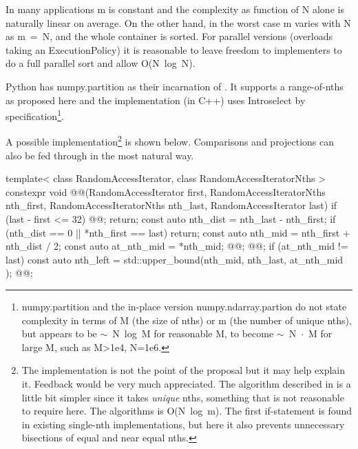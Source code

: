 In many applications m is constant and the complexity as function of N alone is naturally linear on average. On the other hand, in the worst case m varies with N as \mbox{m = N}, and the whole container is sorted. For parallel versions (overloads taking an ExecutionPolicy) it is reasonable to leave freedom to implementers to do a full parallel sort and allow \mbox{O(N log N)}.

Python has numpy.partition\cite{NpPart} as their incarnation of .
It supports a range-of-nths as proposed here and the implementation\cite{NPImpl} (in C++) uses \mbox{Introselect\cite{Musser1997}} by specification\footnote{numpy.partition and the in-place version numpy.ndarray.partion do not state complexity in terms of M (the size of nths) or m (the number of unique nths), but appears to be \mbox{$\sim$ N log M} for reasonable M, to become \mbox{$\sim$ N $\cdot$ M} for large M, such as M>1e4, N=1e6. }.

A possible implementation\footnote{
The implementation is not the point of the proposal but it may help explain it. Feedback would be very much appreciated. 
The algorithm described in \cite{Alsuwaiyel2001} is a little bit simpler since it takes \emph{unique} nths, something that is not reasonable to require here. The algorithms is \mbox{O(N log m)}. The first if-statement is found in existing single-nth  implementations, but here it also prevents unnecessary bisections of equal and near equal nths.}\cite{p2375RefImpl}
is shown below. Comparisons and projections can also be fed through in the most natural way. 

\begin{codeblock}
template< class RandomAccessIterator, class RandomAccessIteratorNths >
constexpr void @@(RandomAccessIterator first, 
  RandomAccessIteratorNths nth_first, RandomAccessIteratorNths nth_last, 
  RandomAccessIterator last)
{
  if (last - first <= 32) { @@; return; }
  const auto nth_dist = nth_last - nth_first;
  if (nth_dist == 0 || *nth_first == last) return;
  const auto nth_mid = nth_first + nth_dist / 2;
  const auto at_nth_mid = *nth_mid;
  @@;
  @@;
  if (at_nth_mid != last){
    const auto nth_left = std::upper_bound(nth_mid, nth_last, at_nth_mid );
    @@;
  }
}

\end{codeblock}

